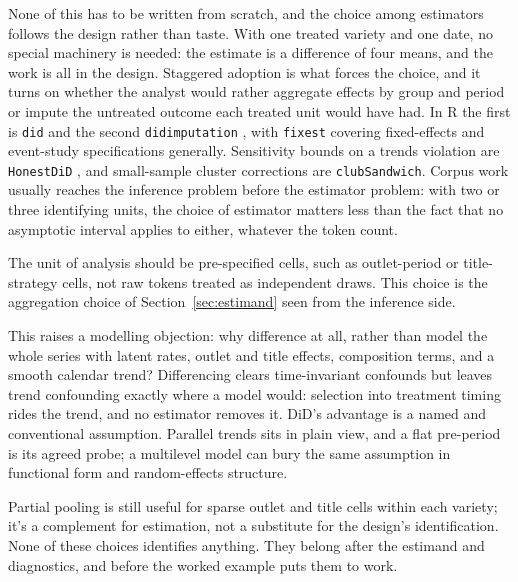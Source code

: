 None of this has to be written from scratch, and the choice among estimators follows the design rather than taste. With one treated variety and one date, no special machinery is needed: the estimate is a difference of four means, and the work is all in the design. Staggered adoption is what forces the choice, and it turns on whether the analyst would rather aggregate effects by group and period or impute the untreated outcome each treated unit would have had. In R the first is \texttt{did} \citep{CallawaySantAnna2021} and the second \texttt{didimputation} \citep{BorusyakJaravelSpiess2024}, with \texttt{fixest} covering fixed-effects and event-study specifications generally. Sensitivity bounds on a trends violation are \texttt{HonestDiD} \citep{RambachanRoth2023}, and small-sample cluster corrections are \texttt{clubSandwich}. Corpus work usually reaches the inference problem before the estimator problem: with two or three identifying units, the choice of estimator matters less than the fact that no asymptotic interval applies to either, whatever the token count.

The unit of analysis should be pre-specified cells, such as outlet-period or title-strategy cells, not raw tokens treated as independent draws. This choice is the aggregation choice of Section~\ref{sec:estimand} seen from the inference side.

This raises a modelling objection: why difference at all, rather than model the whole series with latent rates, outlet and title effects, composition terms, and a smooth calendar trend? Differencing clears time-invariant confounds but leaves trend confounding exactly where a model would: selection into treatment timing rides the trend, and no estimator removes it. DiD's advantage is a named and conventional assumption. Parallel trends sits in plain view, and a flat pre-period is its agreed probe; a multilevel model can bury the same assumption in functional form and random-effects structure.

Partial pooling is still useful for sparse outlet and title cells within each variety; it's a complement for estimation, not a substitute for the design's identification. None of these choices identifies anything. They belong after the estimand and diagnostics, and before the worked example puts them to work.
